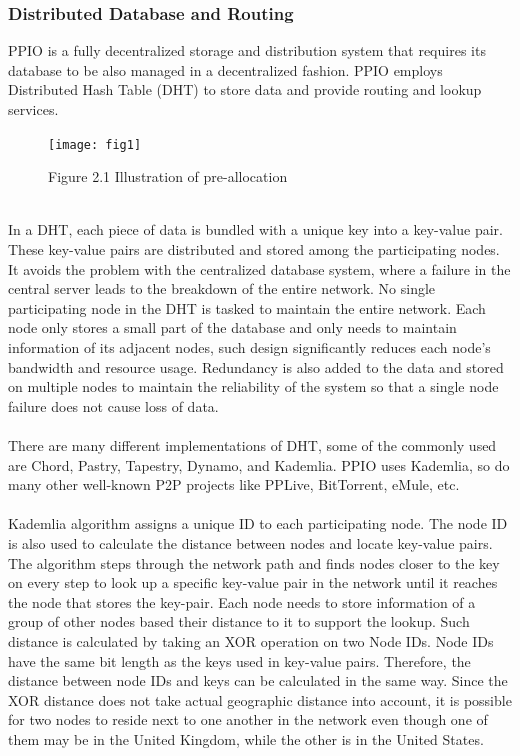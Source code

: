 \documentclass[10pt,a4paper]{article}
\begin{document}
         \subsubsection{Distributed Database and Routing}  %
PPIO is a fully decentralized storage and distribution system that requires its database to be also managed in a decentralized fashion. PPIO employs Distributed Hash Table (DHT) to store data and provide routing and lookup services.\\
\vspace{-0.5em}
\begin{figure}[!htb]   %
    \centering
    \texttt{[image: fig1]}
    \label{circuit}
    \centerline{{Figure 2.1 Illustration of pre-allocation}}
    \vspace{-2.5em}
\end{figure} \\
In a DHT, each piece of data is bundled with a unique key into a key-value pair. These key-value pairs are distributed and stored among the participating nodes. It avoids the problem with the centralized database system, where a failure in the central server leads to the breakdown of the entire network. No single participating node in the DHT is tasked to maintain the entire network. Each node only stores a small part of the database and only needs to maintain information of its adjacent nodes, such design significantly reduces each node’s bandwidth and resource usage. Redundancy is also added to the data and stored on multiple nodes to maintain the reliability of the system so that a single node failure does not cause loss of data.
\vspace{-1.5em}
 \\ \\ There are many different implementations of DHT, some of the commonly used are Chord\cite{article14}, Pastry\cite{article15}, Tapestry\cite{article18}, Dynamo\cite{article19}, and Kademlia\cite{article16}. PPIO uses Kademlia, so do many other well-known P2P projects like PPLive, BitTorrent, eMule, etc.
 \vspace{-0.5em}
 \\ \\Kademlia algorithm assigns a unique ID to each participating node. The node ID is also used to calculate the distance between nodes and locate key-value pairs. The algorithm steps through the network path and finds nodes closer to the key on every step to look up a specific key-value pair in the network until it reaches the node that stores the key-pair. Each node needs to store information of a group of other nodes based their distance to it to support the lookup. Such distance is calculated by taking an XOR operation on two Node IDs. Node IDs have the same bit length as the keys used in key-value pairs. Therefore, the distance between node IDs and keys can be calculated in the same way. Since the XOR distance does not take actual geographic distance into account, it is possible for two nodes to reside next to one another in the network even though one of them may be in the United Kingdom, while the other is in the United States.
\end{document}
